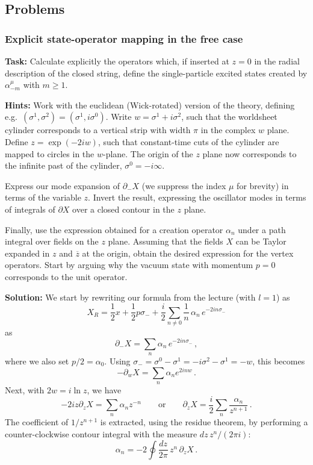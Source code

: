 \documentclass[12pt]{article}
\newcommand{\be}{\begin{equation}}
\newcommand{\ee}{\end{equation}}
\newcommand{\ol}{\overline}
\numberwithin{equation}{section}
\begin{document}
\subsection{Problems}

\subsubsection{Explicit state-operator mapping in the free case}\label{esom}

{\bf Task:} Calculate explicitly the operators which, if inserted at $z=0$ in the radial description of the closed string, define the single-particle excited states created by $\alpha^\mu_{-m}$ with $m\ge 1$. 

\noindent
{\bf Hints:} Work with the euclidean (Wick-rotated) version of the theory, defining e.g.~$(\sigma^1,\sigma^2)=(\sigma^1,i\sigma^0)$. Write $w=\sigma^1+i\sigma^2$, such that the worldsheet cylinder corresponds to a vertical strip with width $\pi$ in the complex $w$ plane. Define $z=\exp(-2iw)$, such that constant-time cuts of the cylinder are mapped to circles in the $w$-plane. The origin of the $z$ plane now corresponds to the infinite past of the cylinder, $\sigma^0=-i\infty$. 

Express our mode expansion of $\partial_-X$ (we suppress the index $\mu$ for brevity) in terms of the variable $z$. Invert the result, expressing the oscillator modes in terms of integrals of $\partial X$ over a closed contour in the $z$ plane. 

Finally, use the expression obtained for a creation operator $\alpha_n$ under a path integral over fields on the $z$ plane. Assuming that the fields $X$ can be Taylor expanded in $z$ and $\ol{z}$ at the origin, obtain the desired expression for the vertex operators. Start by arguing why the vacuum state with momentum $p=0$ corresponds to the unit operator. 

\noindent
{\bf Solution:}
We start by rewriting our formula from the lecture (with $l=1$) as
\be
X_R=\frac{1}{2}x+\frac{1}{2}p\sigma_-+\frac{i}{2}\sum_{n\neq 0}\frac{1}{n}\,\alpha_n\,e^{-2in\sigma_-}
\ee
as
\be
\partial_- X=\sum_n\alpha_n\,e^{-2in\sigma_-}\,,
\ee
where we also set $p/2=\alpha_0$. Using $\sigma_-=\sigma^0-\sigma^1=-i\sigma^2-\sigma^1=-w$, this becomes
\be
-\partial_w X=\sum_n \alpha_n e^{2inw}\,.
\ee
Next, with $2w=i\ln z$, we have
\be
-2iz\partial_z X=\sum_n \alpha_n z^{-n}\qquad\mbox{or}\qquad
\partial_z X = \frac{i}{2}\sum_n\frac{\alpha_n}{z^{n+1}}\,.
\ee
The coefficient of $1/z^{n+1}$ is extracted, using the residue theorem, by performing a counter-clockwise contour integral with the measure $dz\,z^n/(2\pi i)$:
\be
\alpha_n=-2\oint\frac{dz}{2\pi}\,z^n\,\partial_z X\,.\label{alde}
\ee
\end{document}
